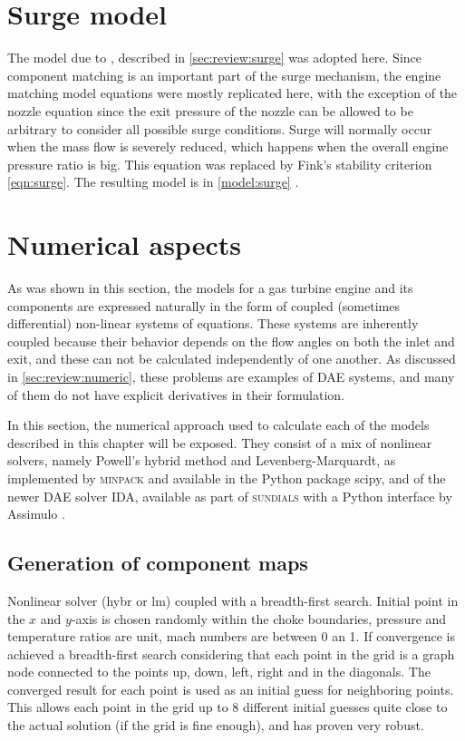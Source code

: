 \documentclass[tcc]{subfiles}
\begin{document}
\section{Surge model}

The model due to \textcite{Fink1988}, described in \cref{sec:review:surge} was adopted here. 
Since component matching is an important part of the surge mechanism, the engine matching model equations were mostly replicated here, with the exception of the nozzle equation since the exit pressure of the nozzle can be allowed to be arbitrary to consider all possible surge conditions. Surge will normally occur when the mass flow is severely reduced, which happens when the overall engine pressure ratio is big. This equation was replaced by Fink's stability criterion \cref{eqn:surge}. The resulting model is in \cref{model:surge} .

\section{Numerical aspects}

As was shown in this section, the models for a gas turbine engine and its components are expressed naturally in the form of coupled (sometimes differential) non-linear systems of equations. 
These systems are inherently coupled because their behavior depends on the flow angles on both the inlet and exit, and these can not be calculated independently of one another.
As discussed in \cref{sec:review:numeric}, these problems are examples of \ac{DAE} systems, and many of them do not have explicit derivatives in their formulation.

In this section, the numerical approach used to calculate each of the models described in this chapter will be exposed. They consist of a mix of nonlinear solvers, namely Powell's hybrid method and Levenberg-Marquardt, as implemented by \textsc{minpack} and available in the Python package scipy, and of the newer \ac{DAE} solver \textsc{IDA}, available as part of \textsc{sundials} \cite{sundials} with a Python interface by Assimulo \cite{assimulo}.

\subsection{Generation of component maps}
Nonlinear solver (hybr or lm) coupled with a breadth-first search. Initial point in the $x$ and $y$-axis is chosen randomly within the choke boundaries, pressure and temperature ratios are unit, mach numbers are between 0 an 1. If convergence is achieved a breadth-first search considering that each point in the grid is a graph node connected to the points up, down, left, right and in the diagonals. The converged result for each point is used as an initial guess for neighboring points. This allows each point in the grid up to 8 different initial guesses quite close to the actual solution (if the grid is fine enough), and has proven very robust. 
\end{document}
